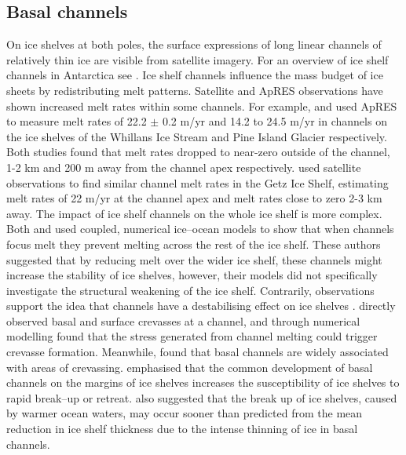 \subsection{Basal channels}

On ice shelves at both poles, the surface expressions of long linear channels of relatively thin ice are visible from satellite imagery. For an overview of ice shelf channels in Antarctica see \cite{alley2016impacts}.
Ice shelf channels influence the mass budget of ice sheets by redistributing melt patterns. Satellite and ApRES observations have shown increased melt rates within some channels. For example, \cite {marsh2016high} and \cite{stanton2013channelized}  used ApRES to measure melt rates of 22.2 $\pm$ 0.2 m/yr and 14.2 to 24.5 m/yr in channels on the ice shelves of the Whillans Ice Stream and Pine Island Glacier respectively. Both studies found that melt rates dropped to near-zero outside of the channel, 1-2 km and 200 m away from the channel apex respectively. \cite{chartrand2020basal} used satellite observations to find similar channel melt rates in the  Getz Ice Shelf, estimating melt rates of 22 m/yr at the channel apex and melt rates close to zero 2-3 km away.
The impact of ice shelf channels on the whole ice shelf is more complex. Both \cite{gladish2012ice} and \cite{millgate2013effect} used coupled, numerical ice--ocean models to show that when channels focus melt they prevent melting across the rest of the ice shelf.  These authors suggested that by reducing melt over the wider ice shelf, these channels might increase the stability of ice shelves, however, their models did not specifically investigate the structural weakening of the ice shelf. Contrarily, observations support the idea that channels have a destabilising effect on ice shelves \cite [e.g.][] {alley2016impacts}. \cite{vaughan2012subglacial} directly observed basal and surface crevasses at a channel, and through numerical modelling found that the stress generated from channel melting could trigger crevasse formation.
Meanwhile, \cite{alley2016impacts} found that basal channels are widely associated with areas of crevassing. \cite{alley2019troughs} emphasised that the common development of basal channels on the margins of ice shelves increases the susceptibility of ice shelves to rapid break--up or retreat.
\cite{rignot2008recent} also suggested that the  break up of ice shelves, caused by warmer ocean waters, may occur sooner than predicted from the mean reduction in ice shelf thickness due to the intense thinning of ice in basal channels.

